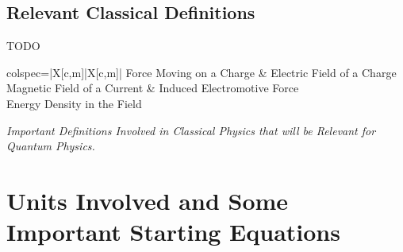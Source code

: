 \documentclass[colorlinks,11pt,a4paper,normalphoto,withhyper,ragged2e]{altareport}
\begin{document}
		
		\subsection{Relevant Classical Definitions}
			TODO
			
			\begin{table}[h!]
				\color{body}
				\begin{tblr}{colspec={|X[c,m]|X[c,m]|}}
			    		\hline
					Force Moving on a Charge & Electric Field of a Charge \\
					\hline
					Magnetic Field of a Current & Induced Electromotive Force \\
					\hline
					 Energy Density in the Field \\
					\hline
				\end{tblr}
				\caption{\label{tab:important_definitions_qm}\textit{Important Definitions Involved in Classical Physics that will be Relevant for Quantum Physics.}}
			\end{table}
			
			
			
			\pagebreak
	
	
	
	
	\section{Units Involved and Some Important Starting Equations}
		
\end{document}
